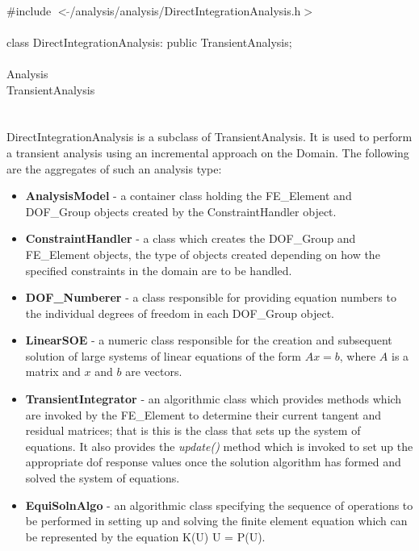 
   \\
\indent \#include $<\tilde{ }$/analysis/analysis/DirectIntegrationAnalysis.h$>$  \\

  \\
\indent class DirectIntegrationAnalysis: public TransientAnalysis;  \\

 \\
\indent Analysis \\
\indent\indent TransientAnalysis \\
\indent\indent{} \\

 \\ 
\indent DirectIntegrationAnalysis is a subclass of TransientAnalysis. It
is used to perform a transient analysis using an incremental approach
on the Domain. The following are the aggregates of such an analysis type: 
\begin{itemize}
\item {\bf AnalysisModel} - a container class holding the FE\_Element
and DOF\_Group objects created by the ConstraintHandler object. 
\item {\bf ConstraintHandler} - a class which creates the DOF\_Group
and FE\_Element objects, the type of objects created depending on how
the specified constraints in the domain are to be handled. 
\item {\bf DOF\_Numberer} - a class responsible for providing equation
numbers to the individual degrees of freedom in each DOF\_Group object.
\item {\bf LinearSOE} - a numeric class responsible for the creation
and subsequent solution of large systems of linear equations of the
form $Ax = b$, where $A$ is a matrix and $x$ and $b$ are vectors.
\item {\bf TransientIntegrator} - an algorithmic class which provides
methods which are invoked by the FE\_Element to determine their
current tangent and residual matrices; that is this is the class that
sets up the system of equations.  It also provides the {\em
update()} method which is invoked to set up the appropriate dof
response values once the solution algorithm has formed and solved the
system of equations.
\item {\bf EquiSolnAlgo} - an algorithmic class specifying the
sequence of operations to be performed in setting up and solving the
finite element equation which can be represented by the equation K(U)
U = P(U). 
\end{itemize}


